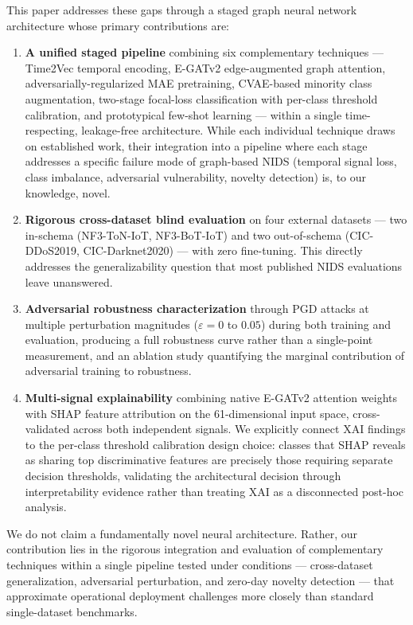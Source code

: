 \documentclass[compsoc,journal]{IEEEtran}
\begin{document}
This paper addresses these gaps through a staged graph neural network architecture whose primary contributions are:

\begin{enumerate}
    \item \textbf{A unified staged pipeline} combining six complementary techniques — Time2Vec temporal encoding, E-GATv2 edge-augmented graph attention, adversarially-regularized MAE pretraining, CVAE-based minority class augmentation, two-stage focal-loss classification with per-class threshold calibration, and prototypical few-shot learning — within a single time-respecting, leakage-free architecture. While each individual technique draws on established work, their integration into a pipeline where each stage addresses a specific failure mode of graph-based NIDS (temporal signal loss, class imbalance, adversarial vulnerability, novelty detection) is, to our knowledge, novel.

    \item \textbf{Rigorous cross-dataset blind evaluation} on four external datasets — two in-schema (NF3-ToN-IoT, NF3-BoT-IoT) and two out-of-schema (CIC-DDoS2019, CIC-Darknet2020) — with zero fine-tuning. This directly addresses the generalizability question that most published NIDS evaluations leave unanswered.

    \item \textbf{Adversarial robustness characterization} through PGD attacks at multiple perturbation magnitudes ($\varepsilon = 0$ to $0.05$) during both training and evaluation, producing a full robustness curve rather than a single-point measurement, and an ablation study quantifying the marginal contribution of adversarial training to robustness.

    \item \textbf{Multi-signal explainability} combining native E-GATv2 attention weights with SHAP feature attribution on the 61-dimensional input space, cross-validated across both independent signals. We explicitly connect XAI findings to the per-class threshold calibration design choice: classes that SHAP reveals as sharing top discriminative features are precisely those requiring separate decision thresholds, validating the architectural decision through interpretability evidence rather than treating XAI as a disconnected post-hoc analysis.
\end{enumerate}

We do not claim a fundamentally novel neural architecture. Rather, our contribution lies in the rigorous integration and evaluation of complementary techniques within a single pipeline tested under conditions — cross-dataset generalization, adversarial perturbation, and zero-day novelty detection — that approximate operational deployment challenges more closely than standard single-dataset benchmarks.
\end{document}
